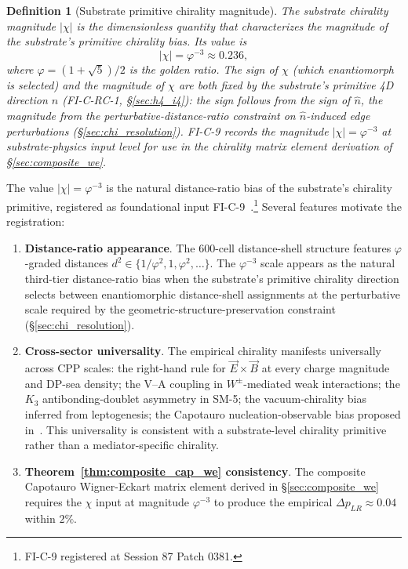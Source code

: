 \documentclass[11pt,letterpaper]{article}
\newtheorem{definition}[theorem]{Definition}
\newcommand{\phig}{\varphi}
\newcommand{\Kthree}{\ensuremath{K_3}}
\newcommand{\DeltapLR}{\Delta p_{LR}}
\begin{document}
\begin{definition}[Substrate primitive chirality magnitude]\label{def:chi_order_parameter}
The substrate chirality magnitude $|\chi|$ is the dimensionless quantity that characterizes the magnitude of the substrate's primitive chirality bias. Its value is
\[
|\chi| = \phig^{-3} \approx 0.236,
\]
where $\phig = (1+\sqrt{5})/2$ is the golden ratio. The sign of $\chi$ (which enantiomorph is selected) and the magnitude of $\chi$ are both fixed by the substrate's primitive 4D direction $\hat{n}$ (FI-C-RC-1, \S\ref{sec:h4_i4}): the sign follows from the sign of $\hat{n}$, the magnitude from the perturbative-distance-ratio constraint on $\hat{n}$-induced edge perturbations (\S\ref{sec:chi_resolution}). FI-C-9 records the magnitude $|\chi| = \phig^{-3}$ at substrate-physics input level for use in the chirality matrix element derivation of \S\ref{sec:composite_we}.
\end{definition}

The value $|\chi| = \phig^{-3}$ is the natural distance-ratio bias of the substrate's chirality primitive, registered as foundational input FI-C-9~\cite{abshier_capotauro_closure_sketch}.\footnote{FI-C-9 registered at Session 87 Patch 0381.} Several features motivate the registration:

\begin{enumerate}\setlength\itemsep{0.2em}
    \item \textbf{Distance-ratio appearance}. The 600-cell distance-shell structure features $\phig$-graded distances $d^2 \in \{1/\phig^2, 1, \phig^2, \ldots\}$. The $\phig^{-3}$ scale appears as the natural third-tier distance-ratio bias when the substrate's primitive chirality direction selects between enantiomorphic distance-shell assignments at the perturbative scale required by the geometric-structure-preservation constraint (\S\ref{sec:chi_resolution}).
    \item \textbf{Cross-sector universality}. The empirical chirality manifests universally across CPP scales: the right-hand rule for $\vec{E} \times \vec{B}$ at every charge magnitude and DP-sea density; the V--A coupling in $W^\pm$-mediated weak interactions; the $\Kthree$ antibonding-doublet asymmetry in SM-5; the vacuum-chirality bias inferred from leptogenesis; the Capotauro nucleation-observable bias proposed in~\cite{abshier_grok_capotauro_2025}. This universality is consistent with a substrate-level chirality primitive rather than a mediator-specific chirality.
    \item \textbf{Theorem~\ref{thm:composite_cap_we} consistency}. The composite Capotauro Wigner-Eckart matrix element derived in \S\ref{sec:composite_we} requires the $\chi$ input at magnitude $\phig^{-3}$ to produce the empirical $\DeltapLR \approx 0.04$ within $2\%$.
\end{enumerate}
\end{document}
